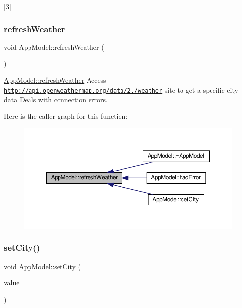 \mbox{[}3\mbox{]} 

\mbox{\label{class_app_model_a37e1da9d028779f7f0fc908e4c04fa76}} 
\subsubsection{\texorpdfstring{refresh\+Weather}{refreshWeather}}
{\footnotesize\ttfamily void App\+Model\+::refresh\+Weather (\begin{DoxyParamCaption}{ }\end{DoxyParamCaption})\hspace{0.3cm}{\ttfamily [slot]}}



\hyperlink{class_app_model_a37e1da9d028779f7f0fc908e4c04fa76}{App\+Model\+::refresh\+Weather} Access \href{http://api.openweathermap.org/data/2.5/weather}{\tt http\+://api.\+openweathermap.\+org/data/2./weather} site to get a specific city data Deals with connection errors. 

Here is the caller graph for this function\+:
\nopagebreak
\begin{figure}[H]
\begin{center}
\leavevmode
\includegraphics[width=350pt]{class_app_model_a37e1da9d028779f7f0fc908e4c04fa76_icgraph}
\end{center}
\end{figure}
\mbox{\label{class_app_model_ad0135d4a1551b6484ac28c434f861af5}} 
\subsubsection{\texorpdfstring{set\+City()}{setCity()}}
{\footnotesize\ttfamily void App\+Model\+::set\+City (\begin{DoxyParamCaption}\item[{const Q\+String \&}]{value }\end{DoxyParamCaption})}

